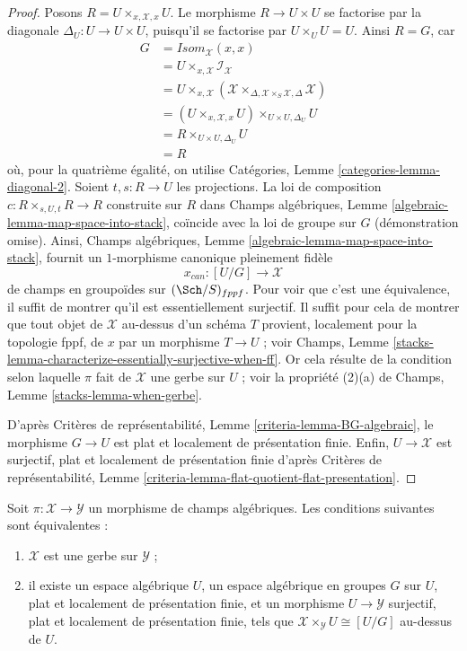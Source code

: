 \begin{proof}
Posons $R = U \times_{x, \mathcal{X}, x} U$. Le morphisme
$R \to U \times U$ se factorise par la diagonale
$\Delta_U : U \to U \times U$, puisqu'il se factorise par
$U \times_U U = U$. Ainsi $R = G$, car
\begin{align*}
G & = \mathit{Isom}_\mathcal{X}(x, x) \\
& = U \times_{x, \mathcal{X}} \mathcal{I}_\mathcal{X} \\
& = U \times_{x, \mathcal{X}}
(\mathcal{X}
\times_{\Delta, \mathcal{X} \times_S \mathcal{X}, \Delta}
\mathcal{X}) \\
& = (U \times_{x, \mathcal{X}, x} U) \times_{U \times U, \Delta_U} U \\
& = R \times_{U \times U, \Delta_U} U \\
& = R
\end{align*}
où, pour la quatrième égalité, on utilise Catégories, Lemme
\ref{categories-lemma-diagonal-2}.
Soient $t, s : R \to U$ les projections. La loi de composition
$c : R \times_{s, U, t} R \to R$ construite sur $R$ dans Champs algébriques,
Lemme \ref{algebraic-lemma-map-space-into-stack}, coïncide avec la loi de
groupe sur $G$ (démonstration omise). Ainsi, Champs algébriques, Lemme
\ref{algebraic-lemma-map-space-into-stack}, fournit un $1$-morphisme canonique
pleinement fidèle
$$
x_{can} : [U/G] \longrightarrow \mathcal{X}
$$
de champs en groupoïdes sur $(\Sch/S)_{fppf}$. Pour voir que c'est une
équivalence, il suffit de montrer qu'il est essentiellement surjectif. Il
suffit pour cela de montrer que tout objet de $\mathcal{X}$ au-dessus d'un
schéma $T$ provient, localement pour la topologie fppf, de $x$ par un morphisme
$T \to U$ ; voir Champs, Lemme
\ref{stacks-lemma-characterize-essentially-surjective-when-ff}. Or cela résulte
de la condition selon laquelle $\pi$ fait de $\mathcal{X}$ une gerbe sur
$U$ ; voir la propriété (2)(a) de Champs, Lemme
\ref{stacks-lemma-when-gerbe}.

\medskip\noindent
D'après Critères de représentabilité, Lemme
\ref{criteria-lemma-BG-algebraic}, le morphisme $G \to U$ est plat et
localement de présentation finie. Enfin, $U \to \mathcal{X}$ est surjectif,
plat et localement de présentation finie d'après Critères de représentabilité,
Lemme
\ref{criteria-lemma-flat-quotient-flat-presentation}.
\end{proof}

\begin{lemma}
\label{lemma-local-structure-gerbe}
Soit $\pi : \mathcal{X} \to \mathcal{Y}$ un morphisme de champs algébriques.
Les conditions suivantes sont équivalentes :
\begin{enumerate}
\item $\mathcal{X}$ est une gerbe sur $\mathcal{Y}$ ;
\item il existe un espace algébrique $U$, un espace algébrique en groupes $G$
sur $U$, plat et localement de présentation finie, et un morphisme
$U \to \mathcal{Y}$ surjectif, plat et localement de présentation finie, tels
que $\mathcal{X} \times_\mathcal{Y} U \cong [U/G]$ au-dessus de $U$.
\end{enumerate}
\end{lemma}

